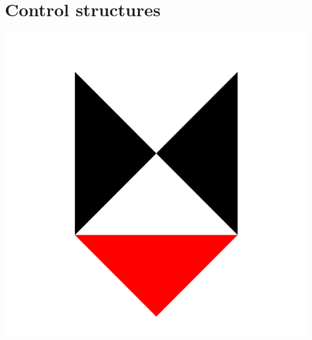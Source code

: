 \documentclass{../refsheet}
\begin{document}
\section{Control structures}




\begin{center}
\includegraphics[scale=0.02]{../images/lycaeum-logo.png}
\end{center}
\end{document}
